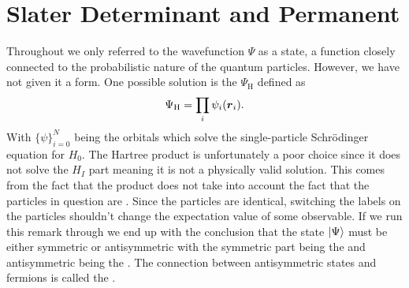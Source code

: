 \section{Slater Determinant and Permanent}
    Throughout  we only referred to the wavefunction $\Psi$ as a
    state, a function closely connected to the probabilistic nature of the
    quantum particles. However, we have not given it a form. One possible
    solution is the  $\Psi_{\text{H}}$ defined as
        \begin{equation}
            \Psi_{\text{H}} = \prod_i\psi_i(\boldsymbol{{r}}_i).
        \end{equation}
    With $\{\psi\}_{i=0}^N$ being the orbitals which solve the single-particle
    Schrödinger equation for $H_0$. The Hartree product is unfortunately a poor
    choice since it does not solve the $H_I$ part meaning it is not a
    physically valid solution. This comes from the fact that the product does
    not take into account the fact that the particles in question are
    . Since the particles are
    identical, switching the labels on the particles shouldn't change the
    expectation value of some observable. If we run this remark through we end
    up with the conclusion that the state $\ket{\Psi}$ must be either symmetric
    or antisymmetric with the symmetric part being the 
    and antisymmetric being the . The connection between
    antisymmetric states and fermions is called the .

